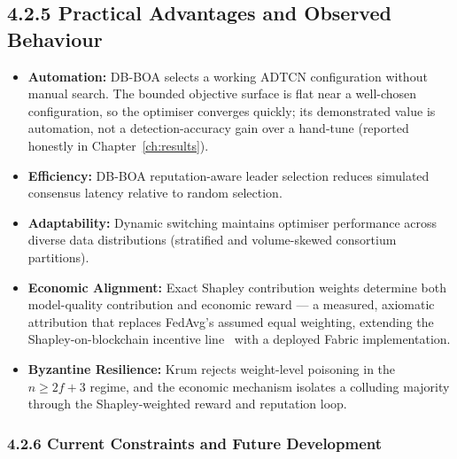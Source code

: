 \subsection*{4.2.5 Practical Advantages and Observed Behaviour}

\begin{itemize}
    \item \textbf{Automation:} DB-BOA selects a working ADTCN configuration without manual search. The bounded objective surface is flat near a well-chosen configuration, so the optimiser converges quickly; its demonstrated value is automation, not a detection-accuracy gain over a hand-tune (reported honestly in Chapter~\ref{ch:results}).
    \item \textbf{Efficiency:} DB-BOA reputation-aware leader selection reduces simulated consensus latency relative to random selection.
    \item \textbf{Adaptability:} Dynamic switching maintains optimiser performance across diverse data distributions (stratified and volume-skewed consortium partitions).
    \item \textbf{Economic Alignment:} Exact Shapley contribution weights determine both model-quality contribution and economic reward — a measured, axiomatic attribution that replaces FedAvg's assumed equal weighting, extending the Shapley-on-blockchain incentive line~\cite{fedcoin2020} with a deployed Fabric implementation.
    \item \textbf{Byzantine Resilience:} Krum rejects weight-level poisoning in the $n\ge 2f+3$ regime, and the economic mechanism isolates a colluding majority through the Shapley-weighted reward and reputation loop.
\end{itemize}

\subsubsection*{4.2.6 Current Constraints and Future Development}

